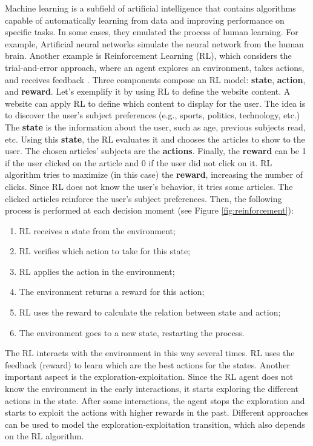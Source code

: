 Machine learning is a subfield of artificial intelligence that contains algorithms capable of automatically learning from data and improving performance on specific tasks. In some cases, they emulated the process of human learning. For example, Artificial neural networks simulate the neural network from the human brain. Another example is Reinforcement Learning (RL), which considers the trial-and-error approach, where an agent explores an environment, takes actions, and receives feedback \cite{kaelbling1996reinforcement}. Three components compose an RL model: \textbf{state}, \textbf{action}, and \textbf{reward}. Let's exemplify it by using RL to define the website content. A website can apply RL to define which content to display for the user. The idea is to discover the user's subject preferences (e.g., sports, politics, technology, etc.) The \textbf{state} is the information about the user, such as age, previous subjects read, etc. Using this \textbf{state}, the RL evaluates it and chooses the articles to show to the user. The chosen articles' subjects are the \textbf{actions}. Finally, the \textbf{reward} can be 1 if the user clicked on the article and 0 if the user did not click on it. RL algorithm tries to maximize (in this case) the \textbf{reward}, increasing the number of clicks. Since RL does not know the user's behavior, it tries some articles. The clicked articles reinforce the user's subject preferences. Then, the following process is performed at each decision moment (see Figure \ref{fig:reinforcement}):
\begin{enumerate}
    \item RL receives a state from the environment;
    \item RL verifies which action to take for this state;
    \item RL applies the action in the environment;
    \item The environment returns a reward for this action;
    \item RL uses the reward to calculate the relation between state and action;
    \item The environment goes to a new state, restarting the process.
\end{enumerate}

The RL interacts with the environment in this way several times. RL uses the feedback (reward) to learn which are the best actions for the states. Another important aspect is the exploration-exploitation. Since the RL agent does not know the environment in the early interactions, it starts exploring the different actions in the state. After some interactions, the agent stops the exploration and starts to exploit the actions with higher rewards in the past. Different approaches can be used to model the exploration-exploitation transition, which also depends on the RL algorithm. 

